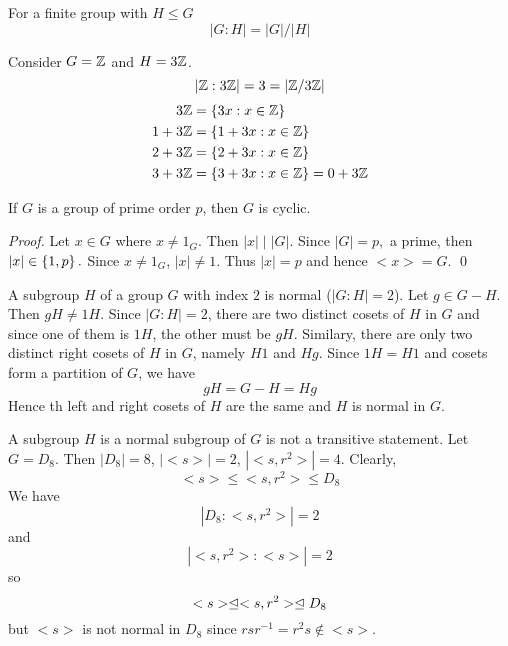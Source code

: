 \begin{example}
    For a finite group with $H\leq G$
    $$|G:H| = |G|/|H|$$
\end{example}

\begin{example}
    Consider $G=\mathbb{Z}$ and $H=3\mathbb{Z}$.
    $$|\mathbb{Z} : 3\mathbb{Z}| = 3 = |\mathbb{Z}/3\mathbb{Z}|$$
    \begin{align*}
        3\mathbb{Z} &= \left\{3x : x \in \mathbb{Z}\right\} \\ 
        1 + 3\mathbb{Z} &= \left\{1 + 3x : x \in \mathbb{Z}\right\} \\
        2 + 3\mathbb{Z} &= \left\{2 + 3x : x \in \mathbb{Z}\right\} \\
        3 + 3\mathbb{Z} &= \left\{3 + 3x : x \in \mathbb{Z}\right\} = 0 + 3\mathbb{Z}
    \end{align*}
\end{example}

\begin{corollary}
    \label{cor10}
    If $G$ is a group of prime order $p$, then $G$ is cyclic.
\end{corollary}

\begin{proof}
    Let $x \in G$ where $x \not = 1_G.$ Then $|x| \mid |G|.$ Since $|G| = p,$ a prime, then $|x| \in \left\{1, p\right\}.$ Since $x \not = 1_G$, $|x| \not = 1.$ Thus $|x| = p$ and hence $<x> = G.$
    \qed
\end{proof}

\begin{example}
    A subgroup $H$ of a group $G$ with index $2$ is normal ($|G : H| = 2$). Let $g \in G - H$. Then $gH \not = 1H$. Since $|G:H|=2$, there are two distinct cosets of $H$ in $G$ and since one of them is $1H$, the other must be $gH$. Similary, there are only two distinct right cosets of $H$ in $G$, namely $H1$ and $Hg$. Since $1H = H1$ and cosets form a partition of $G$, we have 
    $$gH = G - H = Hg$$
    Hence th left and right cosets of $H$ are the same and $H$ is normal in $G$.
\end{example}

\begin{example}
    A subgroup $H$ is a normal subgroup of $G$ is not a transitive statement. Let $G=D_8$. Then $|D_8| = 8$, $|<s>| = 2$, $|<s,r^2>| = 4$. Clearly,
    $$<s> \leq <s, r^2> \leq D_8$$
    We have
    $$|D_8 : <s,r^2>| = 2$$
    and
    $$|<s,r^2> : <s>| = 2$$
    so
    $$<s> \trianglelefteq <s,r^2> \trianglelefteq D_8$$
    but $<s>$ is not normal in $D_8$ since $rsr^{-1} = r^2 s \not \in <s>$.
\end{example}

